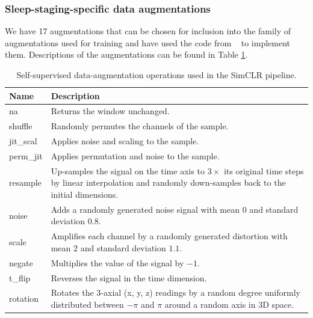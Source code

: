 \documentclass[journal,twoside,web]{ieeecolor}
\begin{document}
\subsubsection{Sleep-staging-specific data augmentations}
We have 17 augmentations that can be chosen for inclusion into the family of augmentations used for training and have used the code from ~\cite{qian2022makes} to implement them. Descriptions of the augmentations can be found in Table \ref{tab:ss_augmentations}.
\begin{table}[h]
  \setlength{\tabcolsep}{1mm}
  \caption{Self-supervised data-augmentation operations used in the SimCLR pipeline.}
  \label{tab:ss_augmentations}
  \centering
  \footnotesize
  \begin{tabular}{|p{18mm}|p{68mm}|}
    \hline
    \textbf{Name} & \textbf{Description} \\ \hline

    na & Returns the window unchanged. \\ \hline

    shuffle & Randomly permutes the channels of the sample. \\ \hline

    jit\_scal & Applies noise and scaling to the sample. \\ \hline

    perm\_jit & Applies permutation and noise to the sample. \\ \hline

    resample & Up-samples the signal on the time axis to $3\times$ its original time steps by linear interpolation and randomly down-samples back to the initial dimensions. \\ \hline

    noise & Adds a randomly generated noise signal with mean $0$ and standard deviation $0.8$. \\ \hline

    scale & Amplifies each channel by a randomly generated distortion with mean $2$ and standard deviation $1.1$. \\ \hline

    negate & Multiplies the value of the signal by $-1$. \\ \hline

    t\_flip & Reverses the signal in the time dimension. \\ \hline

    rotation & Rotates the 3-axial (x, y, z) readings by a random degree uniformly distributed between $-\pi$ and $\pi$ around a random axis in 3D space. \\ \hline


\end{tabular}
\end{table}
\end{document}
